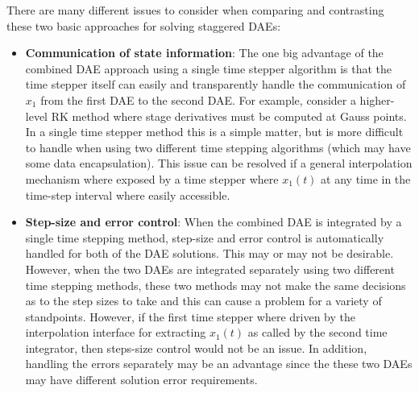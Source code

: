 \documentclass[pdf,ps2pdf,11pt]{SANDreport}
\begin{document}
There are many different issues to consider when comparing and contrasting
these two basic approaches for solving staggered DAEs:
%
\begin{itemize}
%
{}\item {}\textbf{Communication of state information}: The one big advantage
of the combined DAE approach using a single time stepper algorithm is that the
time stepper itself can easily and transparently handle the communication of
$x_1$ from the first DAE to the second DAE.  For example, consider a
higher-level RK method where stage derivatives must be computed at Gauss
points.  In a single time stepper method this is a simple matter, but is more
difficult to handle when using two different time stepping algorithms (which
may have some data encapsulation).  This issue can be resolved if a general
interpolation mechanism where exposed by a time stepper where $x_1(t)$ at any
time in the time-step interval where easily accessible.
%
{}\item {}\textbf{Step-size and error control}: When the combined DAE is
integrated by a single time stepping method, step-size and error control is
automatically handled for both of the DAE solutions.  This may or may not be
desirable.  However, when the two DAEs are integrated separately using two
different time stepping methods, these two methods may not make the same
decisions as to the step sizes to take and this can cause a problem for a
variety of standpoints.  However, if the first time stepper where driven by
the interpolation interface for extracting $x_1(t)$ as called by the second
time integrator, then steps-size control would not be an issue.  In addition,
handling the errors separately may be an advantage since the these two DAEs
may have different solution error requirements.


\end{itemize}
\end{document}
